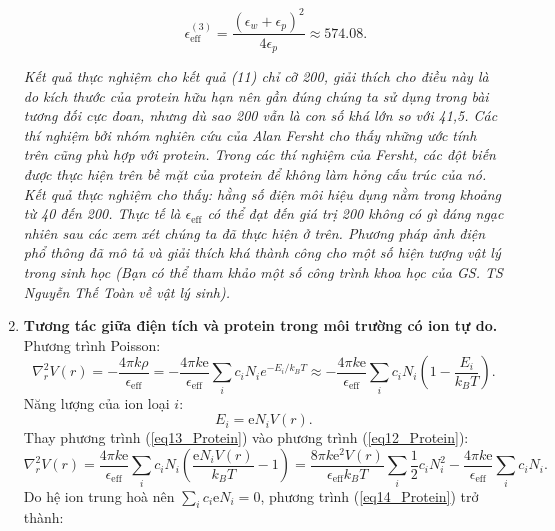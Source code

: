 \begin{enumerate}
\begin{enumerate}[label=\textbf{\alph*,}]
\begin{equation}
          \epsilon_{\text{eff}}^{(3)}=\dfrac{(\epsilon_w+\epsilon_p)^2}{4\epsilon_p}\approx 574.08.
          \end{equation}
     \end{enumerate}
     \textit{Kết quả thực nghiệm cho kết quả (11) chỉ cỡ 200, giải thích cho điều này là do kích thước của protein hữu hạn nên gần đúng chúng ta sử dụng trong bài tương đối cực đoan, nhưng dù sao 200 vẫn là con số khá lớn so với 41,5. Các thí nghiệm bởi nhóm nghiên cứu của Alan Fersht cho thấy những ước tính trên cũng phù hợp với protein. Trong các thí nghiệm của Fersht, các đột biến được thực hiện trên bề mặt của protein để không làm hỏng cấu trúc của nó. Kết quả thực nghiệm cho thấy: hằng số điện môi hiệu dụng nằm trong khoảng từ 40 đến 200. Thực tế là $\epsilon_{\text{eff}}$ có thể đạt đến giá trị 200 không có gì đáng ngạc nhiên sau các xem xét chúng ta đã thực hiện ở trên. Phương pháp ảnh điện phổ thông đã mô tả và giải thích khá thành công cho một số hiện tượng vật lý trong sinh học (Bạn có thể tham khảo một số công trình khoa học của GS. TS Nguyễn Thế Toàn về vật lý sinh).}
     \item \textbf{Tương tác giữa điện tích và protein trong môi trường có ion tự do.} \\ 
     Phương trình Poisson:
\begin{equation} \label{eq12_Protein}
    \nabla^2_r V(r) = - \dfrac{4\pi k \rho}{\epsilon_{\text{eff}}} = - \dfrac{4\pi k \text{e}}{\epsilon_{\text{eff}}}\sum\limits_i {{c_i}{N_i}} {e^{ - E_i/k_BT}} \approx - \dfrac{4\pi k \text{e}}{\epsilon_{\text{eff}}}\sum\limits_i {{c_i}{N_i}}\left(1- \dfrac{E_i}{k_BT}\right).
\end{equation}
Năng lượng của ion loại $i$:
\begin{equation} \label{eq13_Protein}
    E_i=\text{e}N_iV(r).
\end{equation}
Thay phương trình (\ref{eq13_Protein}) vào phương trình (\ref{eq12_Protein}):
\begin{equation} \label{eq14_Protein}
    \nabla^2_r V(r) =  \dfrac{4\pi k \text{e}}{\epsilon_{\text{eff}}}\sum\limits_i {{c_i}{N_i}} \left(\dfrac{\text{e}N_iV(r)}{k_BT}-1 \right)=\dfrac{8\pi k \text{e}^2 V(r)}{\epsilon_{\text{eff}}k_BT}\sum\limits_i \dfrac{1}{2}{{c_i}{N_i^2}} - \dfrac{4\pi k \text{e}}{\epsilon_{\text{eff}}}\sum\limits_i {{c_i}{N_i}}.
\end{equation}
Do hệ ion trung hoà nên $\sum\limits_i {{c_i}{\text{e}N_i}}=0$, phương trình (\ref{eq14_Protein}) trở thành:
\begin{equation} \label{eq15_Protein}

\end{equation}
\end{enumerate}
